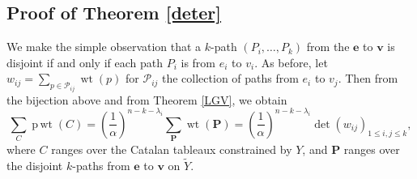 \documentclass[11pt]{article}
\numberwithin{equation}{section}
\theoremstyle{plain}
\theoremstyle{definition}
\theoremstyle{remark}
\DeclareMathOperator{\wt}{wt}
\DeclareMathOperator{\pwt}{p\,wt}
\begin{document}






\subsection{Proof of Theorem \ref{deter}}\label{proof}

We make the simple observation that a $k$-path $(P_i,\ldots,P_k)$ from the $\textbf{e}$ to $\textbf{v}$ is disjoint if and only if each path $P_i$ is from $e_i$ to $v_i$. As before, let $w_{ij}=\sum_{p \in \mathcal{P}_{ij}} \wt(p)$ for $\mathcal{P}_{ij}$ the collection of paths from $e_i$ to $v_j$. Then from the bijection above and from Theorem \ref{LGV}, we obtain
\[
\sum_C \pwt(C) = \left(\frac{1}{\alpha}\right)^{n-k-\lambda_i} \sum_{\textbf{P}} \wt(\textbf{P}) = \left(\frac{1}{\alpha}\right)^{n-k-\lambda_i} \det \left( w_{ij} \right)_{1 \leq i,j \leq k},
\]
where $C$ ranges over the Catalan tableaux constrained by $Y$, and $\textbf{P}$ ranges over the disjoint $k$-paths from $\textbf{e}$ to $\textbf{v}$ on $\tilde{Y}$. 






\end{document}
